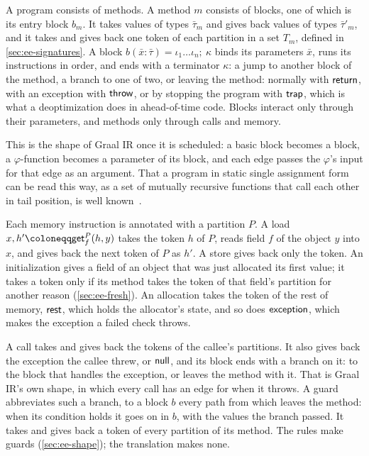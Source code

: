 A program consists of methods. A method $m$ consists of blocks, one of which
is its entry block $b_m$. It takes values of types $\bar\tau_m$ and gives back
values of types $\bar\tau'_m$, and it takes and gives back one token of each
partition in a set $T_m$, defined in \cref{sec:ee-signatures}. A block
$b(\bar x : \bar\tau) = \iota_1 \ldots \iota_n;\ \kappa$ binds its parameters
$\bar x$, runs its instructions in order, and ends with a terminator $\kappa$:
a jump to another block of the method, a branch to one of two, or leaving the
method: normally with $\mathsf{return}$, with an exception with $\mathsf{throw}$, or by stopping
the program with $\mathsf{trap}$, which is what a deoptimization does in
ahead-of-time code. Blocks interact only through their parameters, and methods
only through calls and memory.

This is the shape of Graal IR once it is scheduled: a basic block becomes a
block, a $\varphi$-function becomes a parameter of its block, and each edge
passes the $\varphi$'s input for that edge as an argument. That a program in
static single assignment form can be read this way, as a set of mutually
recursive functions that call each other in tail position, is well
known~\cite{kelsey1995cps,appel1998ssa}.

Each memory instruction is annotated with a partition $P$. A load
$x, h' \coloneqq \getf{f}{P}(h, y)$ takes the token $h$ of $P$, reads field
$f$ of the object $y$ into $x$, and gives back the next token of $P$ as $h'$.
A store gives back only the token. An initialization gives a field of an object
that was just allocated its first value; it takes a token only if its method
takes the token of that field's partition for another reason
(\cref{sec:ee-fresh}). An allocation takes the token of the rest of memory,
$\mathsf{rest}$, which holds the allocator's state, and so does $\mathsf{exception}$, which makes the
exception a failed check throws.

A call takes and gives back the tokens of the callee's partitions. It also gives
back the exception the callee threw, or $\mathsf{null}$, and its block ends with a branch
on it: to the block that handles the exception, or leaves the method with it.
That is Graal IR's own shape, in which every call has an edge for when it
throws. A guard abbreviates such a branch, to a block $b$ every path from which
leaves the method: when its condition holds it goes on in $b$, with the values
the branch passed. It takes and gives back a token of every partition of its
method. The rules make guards (\cref{sec:ee-shape}); the translation makes none.

